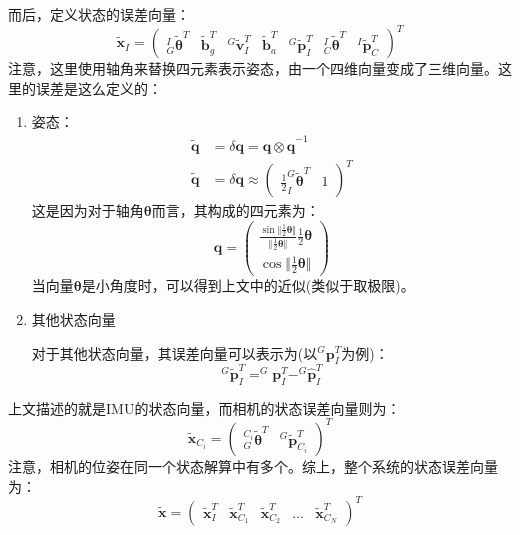 \documentclass[12pt, twocolumn]{article}
\begin{document}
	而后，定义状态的误差向量：
	\begin{equation*}
		\tilde{\boldsymbol{x}}_I=\begin{pmatrix}
			^{I}_{G}\tilde{\boldsymbol{\theta}}^T & \tilde{\boldsymbol{b}}_g^T&^{G}\tilde{\boldsymbol{v}}_I^T&\tilde{\boldsymbol{b}}_a^T&^{G}\tilde{\boldsymbol{p}}_I^T
			& ^{I}_{C}\tilde{\boldsymbol{\theta}}^T &^{I}\tilde{\boldsymbol{p}}_C^T
		\end{pmatrix}^T
	\end{equation*}
	注意，这里使用轴角来替换四元素表示姿态，由一个四维向量变成了三维向量。这里的误差是这么定义的：
	\begin{enumerate}
		\item 姿态：
		\begin{equation*}
			\begin{aligned}
					\tilde{\boldsymbol{q}}&=\delta\boldsymbol{q}=\boldsymbol{q}\otimes \hat{\boldsymbol{q}}^{-1}\\
					\tilde{\boldsymbol{q}}&=\delta\boldsymbol{q}\approx\begin{pmatrix}
						\frac{1}{2}^{G}_{I}\tilde{\boldsymbol{\theta}}^T&1
					\end{pmatrix}^T
			\end{aligned}
		\end{equation*}
	这是因为对于轴角$\boldsymbol{\theta}$而言，其构成的四元素为：
	\begin{equation*}
		\boldsymbol{q}=\begin{pmatrix}
			\frac{\sin\Vert\frac{1}{2} \boldsymbol{\theta}\Vert}{\Vert\frac{1}{2} \boldsymbol{\theta}\Vert}\frac{1}{2}\boldsymbol{\theta}\\\cos\Vert\frac{1}{2} \boldsymbol{\theta}\Vert
		\end{pmatrix}
	\end{equation*}
当向量$\boldsymbol{\theta}$是小角度时，可以得到上文中的近似(类似于取极限)。
	\item 其他状态向量
	
	对于其他状态向量，其误差向量可以表示为(以$^{G}\boldsymbol{p}_I^T$为例)：
	\begin{equation*}
		^{G}\tilde{\boldsymbol{p}}_I^T=^{G}\boldsymbol{p}_I^T-^{G}\hat{\boldsymbol{p}}_I^T
	\end{equation*}
	\end{enumerate}
	
	上文描述的就是IMU的状态向量，而相机的状态误差向量则为：
	\begin{equation*}
		\tilde{\boldsymbol{x}}_{C_i}=\begin{pmatrix}
			^{C_i}_{G}\tilde{\boldsymbol{\theta}}^T &^{G}\tilde{\boldsymbol{p}}_{C_i}^T
		\end{pmatrix}^T
	\end{equation*}
	注意，相机的位姿在同一个状态解算中有多个。综上，整个系统的状态误差向量为：
	\begin{equation*}
		\tilde{\boldsymbol{x}}=\begin{pmatrix}
			\tilde{\boldsymbol{x}}_I^T&\tilde{\boldsymbol{x}}_{C_1}^T&\tilde{\boldsymbol{x}}_{C_2}^T&\dots&\tilde{\boldsymbol{x}}_{C_N}^T
		\end{pmatrix}^T
	\end{equation*}
\end{document}
